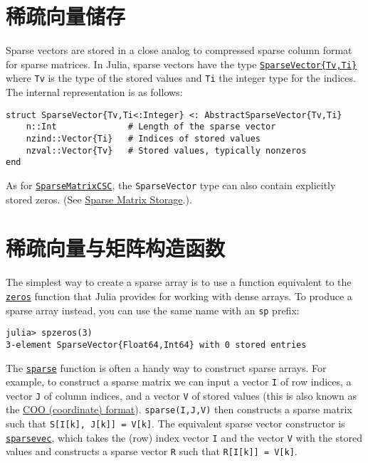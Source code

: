 \hypertarget{6464897929371876878}{}


\section{稀疏向量储存}



Sparse vectors are stored in a close analog to compressed sparse column format for sparse matrices. In Julia, sparse vectors have the type \hyperlink{17594730109701296640}{\texttt{SparseVector\{Tv,Ti\}}} where \texttt{Tv} is the type of the stored values and \texttt{Ti} the integer type for the indices. The internal representation is as follows:




\begin{verbatim}
struct SparseVector{Tv,Ti<:Integer} <: AbstractSparseVector{Tv,Ti}
    n::Int              # Length of the sparse vector
    nzind::Vector{Ti}   # Indices of stored values
    nzval::Vector{Tv}   # Stored values, typically nonzeros
end
\end{verbatim}



As for \hyperlink{15099699527958384292}{\texttt{SparseMatrixCSC}}, the \texttt{SparseVector} type can also contain explicitly stored zeros. (See \hyperlink{4286524230912717228}{Sparse Matrix Storage}.).



\hypertarget{2715559278970050628}{}


\section{稀疏向量与矩阵构造函数}



The simplest way to create a sparse array is to use a function equivalent to the \hyperlink{13837674686090348619}{\texttt{zeros}} function that Julia provides for working with dense arrays. To produce a sparse array instead, you can use the same name with an \texttt{sp} prefix:




\begin{verbatim}
julia> spzeros(3)
3-element SparseVector{Float64,Int64} with 0 stored entries
\end{verbatim}



The \hyperlink{10167157011990389788}{\texttt{sparse}} function is often a handy way to construct sparse arrays. For example, to construct a sparse matrix we can input a vector \texttt{I} of row indices, a vector \texttt{J} of column indices, and a vector \texttt{V} of stored values (this is also known as the \href{https://en.wikipedia.org/wiki/Sparse\_matrix\#Coordinate\_list\_.28COO.29}{COO (coordinate) format}). \texttt{sparse(I,J,V)} then constructs a sparse matrix such that \texttt{S[I[k], J[k]] = V[k]}. The equivalent sparse vector constructor is \hyperlink{13364181309585533450}{\texttt{sparsevec}}, which takes the (row) index vector \texttt{I} and the vector \texttt{V} with the stored values and constructs a sparse vector \texttt{R} such that \texttt{R[I[k]] = V[k]}.




